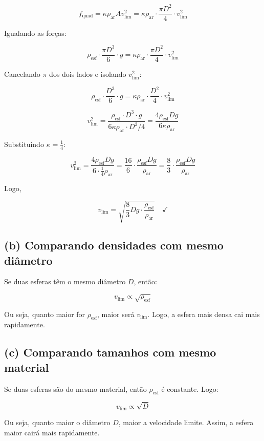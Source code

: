\documentclass[a4paper,12pt]{article}
\begin{document}
\begin{flushleft}
\[
f_{\text{quad}} = \kappa \rho_{\text{ar}} A v_{\text{lim}}^2 = \kappa \rho_{\text{ar}} \cdot \frac{\pi D^2}{4} \cdot v_{\text{lim}}^2
\]

Igualando as forças:

\[
\rho_{\text{esf}} \cdot \frac{\pi D^3}{6} \cdot g = \kappa \rho_{\text{ar}} \cdot \frac{\pi D^2}{4} \cdot v_{\text{lim}}^2
\]

Cancelando \( \pi \) dos dois lados e isolando \( v_{\text{lim}}^2 \):

\[
\rho_{\text{esf}} \cdot \frac{D^3}{6} \cdot g = \kappa \rho_{\text{ar}} \cdot \frac{D^2}{4} \cdot v_{\text{lim}}^2
\]

\[
v_{\text{lim}}^2 = \frac{ \rho_{\text{esf}} \cdot D^3 \cdot g }{6 \kappa \rho_{\text{ar}} \cdot D^2 / 4 } = \frac{4 \rho_{\text{esf}} D g}{6 \kappa \rho_{\text{ar}}}
\]

Substituindo \( \kappa = \frac{1}{4} \):

\[
v_{\text{lim}}^2 = \frac{4 \rho_{\text{esf}} D g}{6 \cdot \frac{1}{4} \rho_{\text{ar}} } = \frac{16}{6} \cdot \frac{\rho_{\text{esf}} D g}{\rho_{\text{ar}} } = \frac{8}{3} \cdot \frac{\rho_{\text{esf}} D g}{\rho_{\text{ar}} }
\]

Logo,

\[
\boxed{
v_{\text{lim}} = \sqrt{ \frac{8}{3} D g \cdot \frac{\rho_{\text{esf}}}{\rho_{\text{ar}}} }} \quad \checkmark
\]

\subsection*{(b) Comparando densidades com mesmo diâmetro}

\colorbox{yellow!20}{Se duas esferas têm o mesmo diâmetro \( D \)}, então:

\[
v_{\text{lim}} \propto \sqrt{ \rho_{\text{esf}} }
\]

Ou seja, quanto maior for \( \rho_{\text{esf}} \), maior será \( v_{\text{lim}} \). \colorbox{red!15}{Logo, a esfera mais densa cai mais} 
\colorbox{red!15}{rapidamente.}

\subsection*{(c) Comparando tamanhos com mesmo material}

Se duas esferas são do mesmo material, então \( \rho_{\text{esf}} \) é constante. Logo:

\[
v_{\text{lim}} \propto \sqrt{D}
\]

Ou seja, \colorbox{red!15}{quanto maior o diâmetro \( D \), maior a velocidade limite.} Assim, a esfera maior cairá mais rapidamente.


\end{flushleft}
\end{document}
